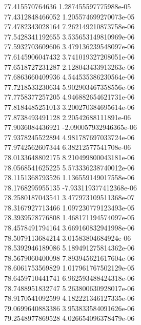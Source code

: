 {77.415570764636 1.287455597775988e-05 \\
77.4312848466052 1.205574699270073e-05 \\
77.4782343028164 7.262149210873758e-06 \\
77.5428341192655 3.535653149810969e-06 \\
77.5932703609606 3.479136239548097e-06 \\
77.6145906047432 3.741019327208051e-06 \\
77.6518727231287 2.128043433913263e-06 \\
77.6863660409936 4.544535386230564e-06 \\
77.7218533230634 5.902903467358556e-06 \\
77.7758377257205 4.946882654621731e-06 \\
77.8184485251013 3.200270384695614e-06 \\
77.8738493491128 2.20542688111891e-06 \\
77.9036084436921 -2.090057932946365e-06 \\
77.9378245522894 4.981787697033724e-06 \\
77.9742562607344 6.38212577541708e-06 \\
78.0133648802175 8.210499800043181e-06 \\
78.0568541625225 5.573336238740012e-06 \\
78.1151368793526 1.136559149017558e-06 \\
78.1768295955135 -7.933119377412368e-06 \\
78.2580187043541 3.477973109511368e-07 \\
78.3167927713466 1.097230779123493e-05 \\
78.3939578776808 1.468171194574097e-05 \\
78.4578491794164 3.669160832941998e-06 \\
78.5079113684214 3.01583804684924e-06 \\
78.5392946189086 5.189491275814362e-06 \\
78.5679060400098 7.893945621617604e-06 \\
78.6061753569829 1.017961767502129e-05 \\
78.6459710441741 6.962593488424318e-06 \\
78.7488951832747 5.263800630928017e-06 \\
78.9170541092599 4.182221346127335e-06 \\
79.0699640883386 3.953833584091626e-06 \\
79.2548977869528 4.026654096378479e-06 \\
}
